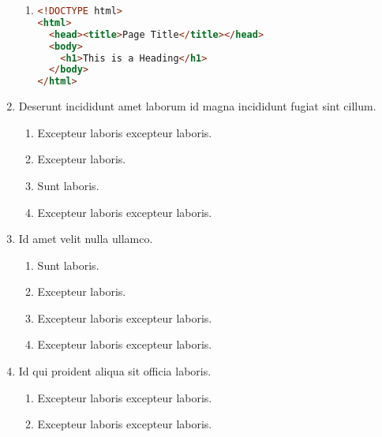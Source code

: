 \documentclass[a4paper,12pt]{article}
\begin{document}
\begin{enumerate}[label=\textbf{\arabic*.}]
\begin{enumerate}
		\item  \hfill \vspace*{-7mm}
    \begin{lstlisting}[language=HTML]
<!DOCTYPE html>
<html>
  <head><title>Page Title</title></head>
  <body>
    <h1>This is a Heading</h1>
  </body>
</html>
    \end{lstlisting}
    
	\end{enumerate}

\item Deserunt incididunt amet laborum id magna incididunt fugiat sint cillum.
\begin{multicols}{2}
	\begin{enumerate}
		\item  Excepteur laboris excepteur laboris.
    
		\item  Excepteur laboris.
    
		\item  Sunt laboris.
    
		\item  Excepteur laboris excepteur laboris.
  
	\end{enumerate}

\end{multicols}
\item Id amet velit nulla ullamco.
\begin{multicols}{2}
	\begin{enumerate}
		\item  Sunt laboris.
    
		\item  Excepteur laboris.
    
		\item  Excepteur laboris excepteur laboris.
  
		\item  Excepteur laboris excepteur laboris.
    
	\end{enumerate}

\end{multicols}
\item Id qui proident aliqua sit officia laboris.
\begin{multicols}{2}
	\begin{enumerate}
		\item  Excepteur laboris excepteur laboris.
  
		\item  Excepteur laboris excepteur laboris.
    

\end{enumerate}
\end{multicols}
\end{enumerate}
\end{document}
